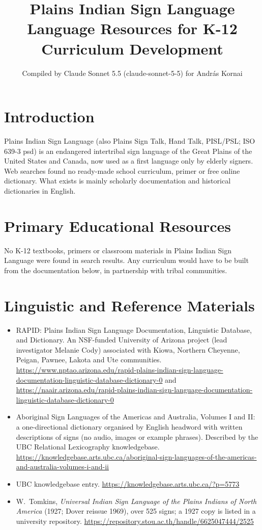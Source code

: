 \documentclass[12pt]{article}
\title{Plains Indian Sign Language Language Resources for K-12 Curriculum Development}
\author{Compiled by Claude Sonnet 5.5 (claude-sonnet-5-5) for Andr\'as Kornai}
\date{}
\begin{document}
\maketitle

\section{Introduction}
Plains Indian Sign Language (also Plains Sign Talk, Hand Talk, PISL/PSL; ISO 639-3 psd) is an endangered intertribal sign language of the Great Plains of the United States and Canada, now used as a first language only by elderly signers. Web searches found no ready-made school curriculum, primer or free online dictionary. What exists is mainly scholarly documentation and historical dictionaries in English.

\section{Primary Educational Resources}
No K-12 textbooks, primers or classroom materials in Plains Indian Sign Language were found in search results. Any curriculum would have to be built from the documentation below, in partnership with tribal communities.

\section{Linguistic and Reference Materials}
\begin{itemize}
\item RAPID: Plains Indian Sign Language Documentation, Linguistic Database, and Dictionary. An NSF-funded University of Arizona project (lead investigator Melanie Cody) associated with Kiowa, Northern Cheyenne, Peigan, Pawnee, Lakota and Ute communities. \url{https://www.nptao.arizona.edu/rapid-plains-indian-sign-language-documentation-linguistic-database-dictionary-0} and \url{https://naair.arizona.edu/rapid-plains-indian-sign-language-documentation-linguistic-database-dictionary-0}
\item Aboriginal Sign Languages of the Americas and Australia, Volumes I and II: a one-directional dictionary organised by English headword with written descriptions of signs (no audio, images or example phrases). Described by the UBC Relational Lexicography knowledgebase. \url{https://knowledgebase.arts.ubc.ca/aboriginal-sign-languages-of-the-americas-and-australia-volumes-i-and-ii}
\item UBC knowledgebase entry. \url{https://knowledgebase.arts.ubc.ca/?p=5773}
\item W.\ Tomkins, \emph{Universal Indian Sign Language of the Plains Indians of North America} (1927; Dover reissue 1969), over 525 signs; a 1927 copy is listed in a university repository. \url{https://repository.stou.ac.th/handle/6625047444/2525}
\end{itemize}
\end{document}
